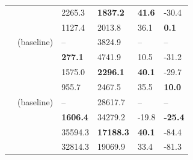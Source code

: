 \begin{table}[!t]
\begin{tabularx}{0.99\textwidth}{AA|tatt}
        & \sleb{} & 2265.3 & \bfseries 1837.2 & \bfseries 41.6 & -30.4 \\
        & \shortllama{} &  1127.4 & 2013.8 & 36.1 & \bfseries 0.1 \\
        \midrule 
        & \lora{} (baseline) & -- & 3824.9 & -- & -- \\
        & \uidl{} & \bfseries 277.1 & 4741.9 & 10.5 &  -31.2 \\
        & \sleb{} & 1575.0 & \bfseries 2296.1 & \bfseries  40.1 & -29.7 \\
        & \shortllama{} &  955.7 & 2467.5 & 35.5 & \bfseries 10.0 \\ 
        \midrule 
        & \lora{} (baseline) & -- & 28617.7 & -- & --\\
        & \uidl{} & \bfseries 1606.4 & 34279.2 & -19.8 & \bfseries -25.4 \\
        & \sleb{} & 35594.3 & \bfseries 17188.3 & \bfseries 40.1 & -84.4 \\
        & \shortllama{} & 32814.3 & 19069.9 & 33.4 & -81.3 \\
        \bottomrule    
    \end{tabularx}
    \label{tab:acceleration}
\end{table}